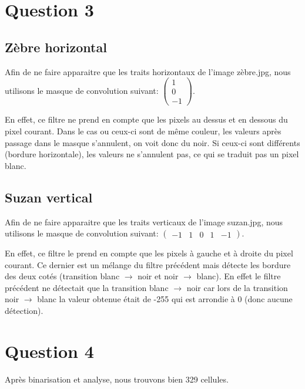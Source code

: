 \documentclass{report}
\begin{document}
		\section{Question 3}
			\subsection{Zèbre horizontal}
				Afin de ne faire apparaitre que les traits horizontaux de l'image zèbre.jpg, nous utilisons le masque de convolution suivant: $\left( \begin{array}{c}1\\0\\-1\end{array}\right)$.
				
				En effet, ce filtre ne prend en compte que les pixels au dessus et en dessous du pixel courant. Dans le cas ou ceux-ci sont de même couleur, les valeurs après passage dans le masque s'annulent, on voit donc du noir. Si ceux-ci sont différents (bordure horizontale), les valeurs ne s'annulent pas, ce qui se traduit pas un pixel blanc.
				

			\subsection{Suzan vertical}
				Afin de ne faire apparaitre que les traits verticaux de l'image suzan.jpg, nous utilisons le masque de convolution suivant: $\left( \begin{array}{ccccc}-1&1&0&1&-1\end{array}\right)$.
				
				En effet, ce filtre le prend en compte que les pixels à gauche et à droite du pixel courant. Ce dernier est un mélange du filtre précédent mais détecte les bordure des deux cotés (transition blanc $\rightarrow$ noir et noir $\rightarrow$ blanc). En effet le filtre précédent ne détectait que la transition blanc $\rightarrow$ noir car lors de la transition noir $\rightarrow$ blanc la valeur obtenue était de -255 qui est arrondie à 0 (donc aucune détection).
				
				
		\section{Question 4}
			Après binarisation et analyse, nous trouvons bien 329 cellules.
\end{document}
